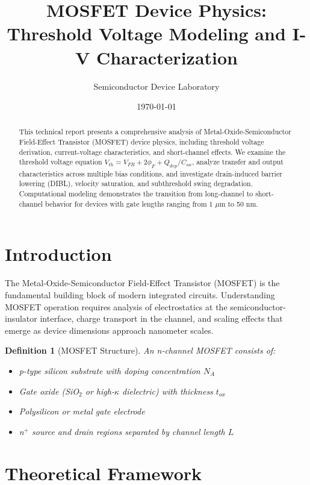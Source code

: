 \documentclass[a4paper, 11pt]{article}
\title{MOSFET Device Physics: Threshold Voltage Modeling and I-V Characterization}
\author{Semiconductor Device Laboratory}
\date{\today}
\newtheorem{definition}{Definition}[section]
\begin{document}
\maketitle

\begin{abstract}
This technical report presents a comprehensive analysis of Metal-Oxide-Semiconductor Field-Effect Transistor (MOSFET) device physics, including threshold voltage derivation, current-voltage characteristics, and short-channel effects. We examine the threshold voltage equation $V_{th} = V_{FB} + 2\phi_F + Q_{dep}/C_{ox}$, analyze transfer and output characteristics across multiple bias conditions, and investigate drain-induced barrier lowering (DIBL), velocity saturation, and subthreshold swing degradation. Computational modeling demonstrates the transition from long-channel to short-channel behavior for devices with gate lengths ranging from 1 $\mu$m to 50 nm.
\end{abstract}

\section{Introduction}

The Metal-Oxide-Semiconductor Field-Effect Transistor (MOSFET) is the fundamental building block of modern integrated circuits. Understanding MOSFET operation requires analysis of electrostatics at the semiconductor-insulator interface, charge transport in the channel, and scaling effects that emerge as device dimensions approach nanometer scales.

\begin{definition}[MOSFET Structure]
An n-channel MOSFET consists of:
\begin{itemize}
\item p-type silicon substrate with doping concentration $N_A$
\item Gate oxide (SiO$_2$ or high-$\kappa$ dielectric) with thickness $t_{ox}$
\item Polysilicon or metal gate electrode
\item n$^+$ source and drain regions separated by channel length $L$
\end{itemize}
\end{definition}

\section{Theoretical Framework}
\end{document}
